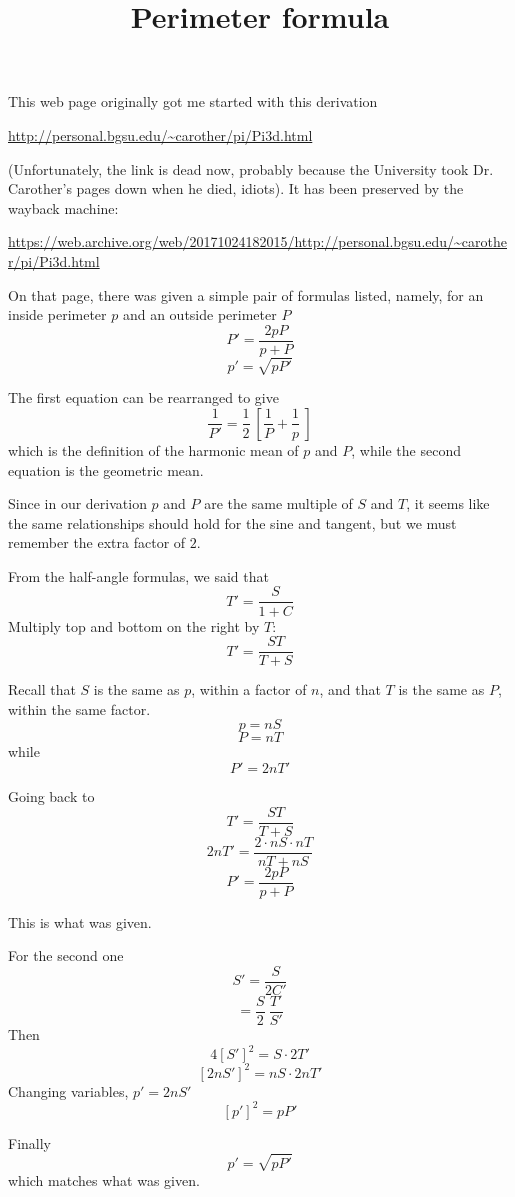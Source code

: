 \documentclass[11pt, oneside]{article}
\title{Perimeter formula}
\date{}
\begin{document}
\maketitle
\Large

This web page originally got me started with this derivation

\url{http://personal.bgsu.edu/~carother/pi/Pi3d.html}

(Unfortunately, the link is dead now, probably because the University took Dr. Carother's pages down when he died, idiots).  It has been preserved by the wayback machine:

\url{https://web.archive.org/web/20171024182015/http://personal.bgsu.edu/~carother/pi/Pi3d.html}

On that page, there was given a simple pair of formulas listed, namely, for an inside perimeter $p$ and an outside perimeter $P$
\[ P' = \frac{2pP}{p + P} \]
\[ p' = \sqrt{pP'} \]

The first equation can be rearranged to give
\[ \frac{1}{P'} = \frac{1}{2} \ [ \frac{1}{P} + \frac{1}{p} \ ] \]
which is the definition of the harmonic mean of $p$ and $P$, while the second equation is the geometric mean.

Since in our derivation $p$ and $P$ are the same multiple of $S$ and $T$, it seems like the same relationships should hold for the sine and tangent, but we must remember the extra factor of $2$.

From the half-angle formulas, we said that
\[ T'  = \frac{S}{1 + C} \]
Multiply top and bottom on the right by $T$:
\[ T' = \frac{ST}{T + S} \]

Recall that $S$ is the same as $p$, within a factor of $n$, and that $T$ is the same as $P$, within the same factor.
\[ p = nS \]
\[ P = nT \]
while 
\[ P' = 2nT' \]

Going back to 
\[ T' = \frac{ST}{T + S} \]
\[ 2nT' = \frac{2 \cdot nS \cdot nT}{nT + nS} \]
\[ P' = \frac{2pP}{p + P} \]

This is what was given.

For the second one
\[ S' = \frac{S}{2 C'} \]
\[ = \frac{S}{2} \ \frac{T'}{S'} \]
Then
\[ 4[S']^2 = S \cdot 2T' \]
\[ [2nS']^2 = nS \cdot 2nT' \]
Changing  variables, $p' = 2nS'$
\[ [p']^2 = pP' \]

Finally
\[ p' = \sqrt{pP'} \]
which matches what was given.
\end{document}
